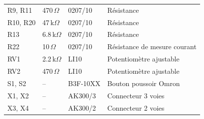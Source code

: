 \documentclass[a4paper,12pt,openany]{book}
\begin{document}
\begin{longtable}{|p{3.8cm}|p{3cm}|p{3.5cm}|p{5.5cm}|}
  R9, R11                      & 470\,$\Omega$   & 0207/10       & R\'esistance \\
  R10, R20                     & 47\,k$\Omega$   & 0207/10       & R\'esistance \\
  R13                           & 6.8\,k$\Omega$  & 0207/10       & R\'esistance \\
  R22                           & 10\,$\Omega$    & 0207/10       & R\'esistance de mesure courant \\
  \hline
  RV1                           & 2.2\,k$\Omega$  & LI10          & Potentiom\`etre ajustable \\
  RV2                           & 470\,$\Omega$   & LI10          & Potentiom\`etre ajustable \\
  \hline
  S1, S2                        & --              & B3F-10XX      & Bouton poussoir Omron \\
  \hline
  X1, X2                        & --              & AK300/3       & Connecteur 3 voies \\
  X3, X4                        & --              & AK300/2       & Connecteur 2 voies \\
  \hline
\end{longtable}
\end{document}
